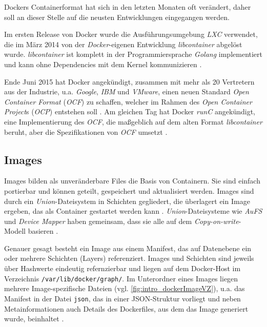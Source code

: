 \documentclass[../main.tex]{subfiles}
\begin{document}
			Dockers Containerformat hat sich in den letzten Monaten oft verändert, daher soll an dieser Stelle auf die neusten Entwicklungen eingegangen werden.

			Im ersten Release von Docker wurde die Ausführungsumgebung \emph{LXC} verwendet, die im März 2014 von der \emph{Docker}-eigenen Entwicklung \emph{libcontainer} abgelöst wurde. \emph{libcontainer} ist komplett in der Programmiersprache \emph{Golang} implementiert und kann ohne Dependencies mit dem Kernel kommunizieren \cite{dockerLibcontainer}.

			Ende Juni 2015 hat Docker angekündigt, zusammen mit mehr als 20 Vertretern aus der Industrie, u.a. \emph{Google}, \emph{IBM} und \emph{VMware}, einen neuen Standard \emph{Open Container Format} (\emph{\acrshort{OCF}}) zu schaffen, welcher im Rahmen des \emph{Open Container Project}s (\emph{\acrshort{OCP}}) entstehen soll \cite{dockerOCP}. Am gleichen Tag hat Docker \emph{runC} angekündigt, eine Implementierung des \emph{\acrshort{OCF}}, die maßgeblich auf dem alten Format \emph{libcontainer} beruht, aber die Spezifikationen von \emph{\acrshort{OCF}} umsetzt \cite{dockerRunC}\cite{dockerRunCGithub}\cite{runC}.

		\subsection{Images}
    \label{dockerImages}
			Images bilden als unveränderbare Files die Basis von Containern. Sie sind einfach portierbar und können geteilt, gespeichert und aktualisiert werden. Images sind durch ein \emph{Union}-Dateisystem in Schichten gegliedert, die überlagert ein Image ergeben, das als Container gestartet werden kann \cite[S.11]{dockerBook}. \emph{Union}-Dateisysteme wie \emph{AuFS} und \emph{Device Mapper} haben gemeinsam, dass sie alle auf dem \emph{Copy-on-write}-Modell basieren \cite[S.8]{dockerBook}\cite[S.3]{dockerIntroIEEE}\cite[S.4]{dockerSecIntro}.

			Genauer gesagt besteht ein Image aus einem Manifest, das auf Datenebene ein oder mehrere Schichten (Layers) referenziert. Images und Schichten sind jeweils über Hashwerte eindeutig refernzierbar und liegen auf dem Docker-Host im Verzeichnis \texttt{/var/lib/docker/graph/}. Im Unterordner eines Images liegen mehrere Image-spezifische Dateien (vgl. \fig \ref{fig:intro_dockerImageVZ}), u.a. das Manifest in der Datei \texttt{json}, das in einer \acrshort{JSON}-Struktur vorliegt und neben Metainformationen auch Details des Dockerfiles, aus dem das Image generiert wurde, beinhaltet \cite{githubDockerGlossary}.
\end{document}
